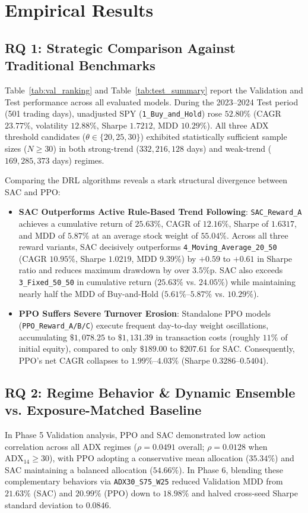 \documentclass[10pt,twocolumn,conference]{IEEEtran}
\begin{document}
\section{Empirical Results}

\subsection{RQ 1: Strategic Comparison Against Traditional Benchmarks}
Table~\ref{tab:val_ranking} and Table~\ref{tab:test_summary} report the Validation and Test performance across all evaluated models. During the 2023--2024 Test period (501 trading days), unadjusted SPY (\texttt{1\_Buy\_and\_Hold}) rose $52.80\%$ (CAGR $23.77\%$, volatility $12.88\%$, Sharpe $1.7212$, MDD $10.29\%$). All three ADX threshold candidates ($\theta \in \{20, 25, 30\}$) exhibited statistically sufficient sample sizes ($N \ge 30$) in both strong-trend ($332, 216, 128$ days) and weak-trend ($169, 285, 373$ days) regimes.

Comparing the DRL algorithms reveals a stark structural divergence between SAC and PPO:
\begin{itemize}
    \item \textbf{SAC Outperforms Active Rule-Based Trend Following}: \texttt{SAC\_Reward\_A} achieves a cumulative return of $25.63\%$, CAGR of $12.16\%$, Sharpe of $1.6317$, and MDD of $5.87\%$ at an average stock weight of $55.04\%$. Across all three reward variants, SAC decisively outperforms \texttt{4\_Moving\_Average\_20\_50} (CAGR $10.95\%$, Sharpe $1.0219$, MDD $9.39\%$) by $+0.59$ to $+0.61$ in Sharpe ratio and reduces maximum drawdown by over $3.5\%$p. SAC also exceeds \texttt{3\_Fixed\_50\_50} in cumulative return ($25.63\%$ vs. $24.05\%$) while maintaining nearly half the MDD of Buy-and-Hold ($5.61\%\text{--}5.87\%$ vs. $10.29\%$).
    \item \textbf{PPO Suffers Severe Turnover Erosion}: Standalone PPO models (\texttt{PPO\_Reward\_A/B/C}) execute frequent day-to-day weight oscillations, accumulating $\$1,078.25$ to $\$1,131.39$ in transaction costs (roughly $11\%$ of initial equity), compared to only $\$189.00$ to $\$207.61$ for SAC. Consequently, PPO's net CAGR collapses to $1.99\%\text{--}4.03\%$ (Sharpe $0.3286\text{--}0.5404$).
\end{itemize}

\subsection{RQ 2: Regime Behavior \& Dynamic Ensemble vs. Exposure-Matched Baseline}
In Phase 5 Validation analysis, PPO and SAC demonstrated low action correlation across all ADX regimes ($\rho = 0.0491$ overall; $\rho = 0.0128$ when $\text{ADX}_{14} \ge 30$), with PPO adopting a conservative mean allocation ($35.34\%$) and SAC maintaining a balanced allocation ($54.66\%$). In Phase 6, blending these complementary behaviors via \texttt{ADX30\_S75\_W25} reduced Validation MDD from $21.63\%$ (SAC) and $20.99\%$ (PPO) down to $18.98\%$ and halved cross-seed Sharpe standard deviation to $0.0846$.
\end{document}
